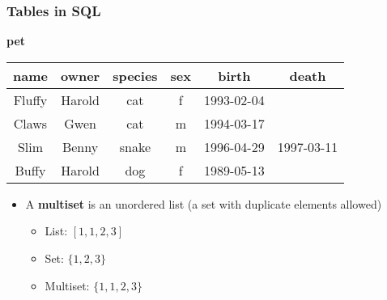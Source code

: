 \documentclass[hyperref={pdfpagelabels=false},svgnames,xcolor=table]{beamer}
\begin{document}
\begin{frame}
  \frametitle{Tables in SQL}
  \textbf{pet} \\
  \begin{tabular}{|c|c|c|c|c|c|}
    \hline
    \textbf{name} & \textbf{owner} & \textbf{species} & \textbf{sex} & \textbf{birth} & \textbf{death} \\
    \hline
    Fluffy & Harold & cat & f & 1993-02-04 & \\
    \hline
    Claws & Gwen & cat & m & 1994-03-17 & \\
    \hline
    Slim & Benny & snake & m & 1996-04-29 & 1997-03-11 \\
    \hline
    Buffy & Harold & dog & f & 1989-05-13 & \\
    \hline
  \end{tabular}
  \bigskip
  \begin{itemize}
  \item A \textbf{multiset} is an unordered list (a set with duplicate elements
    allowed)
      \begin{itemize}
        \item List: $[1, 1, 2, 3]$
        \item Set: $\{1, 2, 3\}$
        \item Multiset: $\{1, 1, 2, 3\}$
      \end{itemize}
  \end{itemize}
\end{frame}
\end{document}
